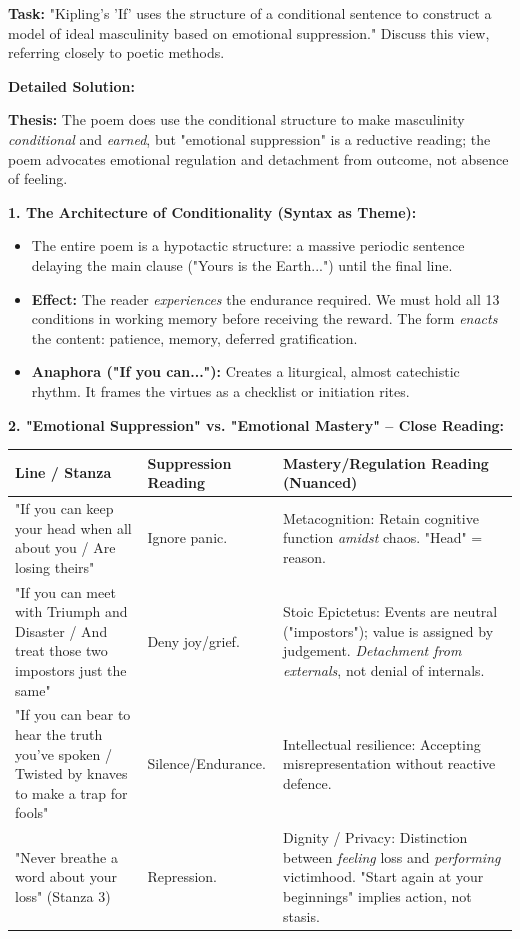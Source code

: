 \documentclass[11pt]{article}
\newcommand{\cle}[1]{{\popxbold\color{popdark}#1}}
\begin{document}
\begin{exoresolu}
\textbf{Task:} "Kipling's 'If' uses the structure of a conditional sentence to construct a model of ideal masculinity based on emotional suppression." Discuss this view, referring closely to poetic methods.

\tcblower
\textbf{Detailed Solution:}

\textbf{Thesis:} The poem does use the conditional structure to make masculinity \emph{conditional} and \emph{earned}, but "emotional suppression" is a reductive reading; the poem advocates \cle{emotional regulation} and \cle{detachment from outcome}, not absence of feeling.

\textbf{1. The Architecture of Conditionality (Syntax as Theme):}
\begin{itemize}
    \item The entire poem is a \cle{hypotactic} structure: a massive \cle{periodic sentence} delaying the main clause ("Yours is the Earth...") until the final line.
    \item \textbf{Effect:} The reader \emph{experiences} the endurance required. We must hold all 13 conditions in working memory before receiving the reward. The form \emph{enacts} the content: \cle{patience, memory, deferred gratification}.
    \item \textbf{Anaphora ("If you can..."):} Creates a \cle{liturgical}, almost catechistic rhythm. It frames the virtues as a \cle{checklist} or \cle{initiation rites}.
\end{itemize}

\textbf{2. "Emotional Suppression" vs. "Emotional Mastery" -- Close Reading:}
\begin{center}
\begin{tabularx}{\linewidth}{|l|X|X|}
\hline
\rowcolor{popblueL} \textbf{Line / Stanza} & \textbf{Suppression Reading} & \textbf{Mastery/Regulation Reading (Nuanced)} \\
\hline
"If you can keep your head when all about you / Are losing theirs" & Ignore panic. & \cle{Metacognition}: Retain cognitive function \emph{amidst} chaos. "Head" = reason. \\
\hline
"If you can meet with Triumph and Disaster / And treat those two impostors just the same" & Deny joy/grief. & \cle{Stoic Epictetus}: Events are neutral ("impostors"); value is assigned by judgement. \emph{Detachment from externals}, not denial of internals. \\
\hline
"If you can bear to hear the truth you've spoken / Twisted by knaves to make a trap for fools" & Silence/Endurance. & \cle{Intellectual resilience}: Accepting misrepresentation without reactive defence. \\
\hline
"Never breathe a word about your loss" (Stanza 3) & Repression. & \cle{Dignity / Privacy}: Distinction between \emph{feeling} loss and \emph{performing} victimhood. "Start again at your beginnings" implies \cle{action}, not stasis. \\
\hline
\end{tabularx}
\end{center}


\end{exoresolu}
\end{document}
